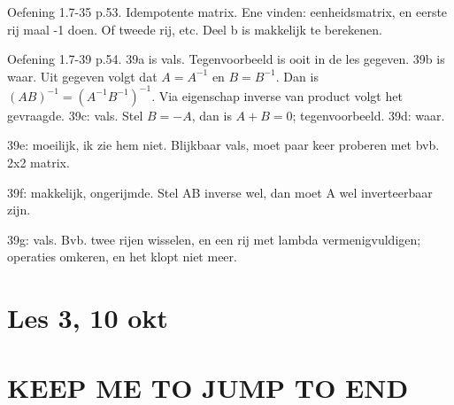 \documentclass{article}
\begin{document}
Oefening 1.7-35 p.53. Idempotente matrix. Ene vinden: eenheidsmatrix, en eerste rij maal -1 doen. Of tweede rij, etc. Deel b is makkelijk te berekenen. 

Oefening 1.7-39 p.54. 39a is vals. Tegenvoorbeeld is ooit in de les gegeven. 39b is waar. Uit gegeven volgt dat $A=A^{-1}$ en $B=B^{-1}$. Dan is $(AB)^{-1} = (A^{-1}B^{-1})^{-1}$. Via eigenschap inverse van product volgt het gevraagde. 
39c: vals. Stel $B=-A$, dan is $A+B=0$; tegenvoorbeeld.
39d: waar. 

39e: moeilijk, ik zie hem niet. Blijkbaar vals, moet paar keer proberen met bvb. 2x2 matrix. 

39f: makkelijk, ongerijmde. Stel AB inverse wel, dan moet A wel inverteerbaar zijn. 

39g: vals. Bvb. twee rijen wisselen, en een rij met  lambda vermenigvuldigen; operaties omkeren, en het klopt niet meer. 

\section{Les 3, 10 okt}




\section{KEEP ME TO JUMP TO END}
\end{document}
